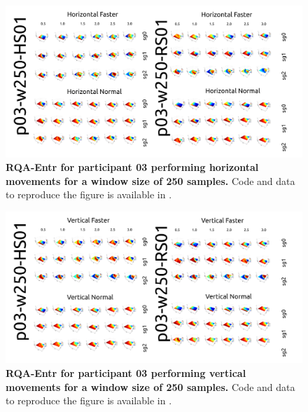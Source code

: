\documentclass[12pt]{article}
\begin{document}
\newpage
\begin{figure}[ht!]
\centering
\includegraphics{figures/rqa/output/epsilons/rqa-epsilonsp03w250Horizontal}
    	\caption{
	{\bf RQA-Entr for participant 03 performing horizontal movements for a window size of 250 samples.}
	Code and data to reproduce the figure is available in \cite{srep2021}.
        }
    \label{fig-p03-H-w250}
\end{figure}
\begin{figure}[hb!]
\centering
\includegraphics{figures/rqa/output/epsilons/rqa-epsilonsp03w250Vertical}
    	\caption{
	{\bf RQA-Entr for participant 03 performing vertical movements for a window size of 250 samples.}
	Code and data to reproduce the figure is available in \cite{srep2021}.
        }
    \label{fig-p03-V-w250}
\end{figure}
\end{document}
